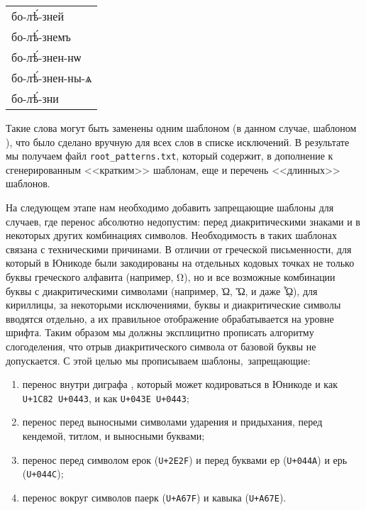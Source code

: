\documentclass[12pt,a4paper,oneside]{extarticle}
\begin{document}
\begin{center}
\begin{churchslavonic}
\begin{tabular}{l}
бо-лѣ́-зней \\
бо-лѣ́-знемъ \\
бо-лѣ́-знен-нѡ \\
бо-лѣ́-знен-ны-ѧ \\
бо-лѣ́-зни \\
\end{tabular}
\end{churchslavonic}
\end{center}

Такие слова могут быть заменены одним шаблоном (в данном случае, шаблоном ), что было сделано вручную для всех слов в списке исключений. В результате мы получаем файл \verb+root_patterns.txt+, который содержит, в дополнение к сгенерированным <<кратким>> шаблонам, еще и перечень <<длинных>> шаблонов.

На следующем этапе нам необходимо добавить запрещающие шаблоны для случаев, где перенос абсолютно недопустим: перед диакритическими знаками и в некоторых других комбинациях символов. Необходимость в таких шаблонах связана с техническими причинами. В отличии от греческой письменности, для который в Юникоде были закодированы на отдельных кодовых точках не только буквы греческого алфавита (например, \textgreek{Ω}), но и все возможные комбинации буквы с диакритическими символами (например, \textgreek{Ὠ}, \textgreek{Ὥ}, и даже \textgreek{ᾯ}), для кириллицы, за некоторыми исключениями, буквы и диакритические символы вводятся отдельно, а их правильное отображение обрабатывается на уровне шрифта. Таким образом мы должны эксплицитно прописать алгоритму слогоделения, что отрыв диакритического символа от базовой буквы не допускается. С этой целью мы прописываем шаблоны, запрещающие:

\begin{enumerate}
\item перенос внутри диграфа , который может кодироваться в Юникоде и как \verb!U+1C82 U+0443!, и как \verb!U+043E U+0443!;
\item перенос перед выносными символами ударения и придыхания, перед кендемой, титлом, и выносными буквами\autocite[Полный перечень символов вместе с их кодовыми точками в Юникоде, а также полный перечень возможных слов с титлом или буквенными титлами см. в работе ][]{utn41};
\item перенос перед символом ерок (\verb!U+2E2F!) и перед буквами ер (\verb!U+044A!) и ерь (\verb!U+044C!);
\item перенос вокруг символов паерк (\verb!U+A67F!) и кавыка (\verb!U+A67E!).
\end{enumerate}
\end{document}
